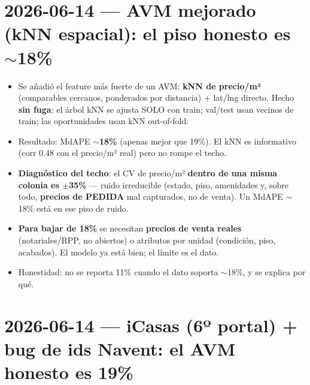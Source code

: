 \documentclass[11pt]{article}
\begin{document}
\section*{2026-06-14 — AVM mejorado (kNN espacial): el piso honesto es $\sim$18\%}

\begin{itemize}
  \item Se añadió el feature más fuerte de un AVM: \textbf{kNN de precio/m²}
        (comparables cercanos, ponderados por distancia) + lat/lng directo. Hecho
        \textbf{sin fuga}: el árbol kNN se ajusta SOLO con train; val/test usan
        vecinos de train; las oportunidades usan kNN out-of-fold.
  \item Resultado: MdAPE $\sim$\textbf{18\%} (apenas mejor que 19\%). El kNN es
        informativo (corr 0.48 con el precio/m² real) pero no rompe el techo.
  \item \textbf{Diagnóstico del techo}: el CV de precio/m² \textbf{dentro de una
        misma colonia es $\pm$35\%} — ruido irreducible (estado, piso, amenidades
        y, sobre todo, \textbf{precios de PEDIDA} mal capturados, no de venta).
        Un MdAPE $\sim$18\% está en ese piso de ruido.
  \item \textbf{Para bajar de 18\%} se necesitan \textbf{precios de venta reales}
        (notariales/RPP, no abiertos) o atributos por unidad (condición, piso,
        acabados). El modelo ya está bien; el límite es el dato.
  \item Honestidad: no se reporta 11\% cuando el dato soporta $\sim$18\%, y se
        explica por qué.
\end{itemize}

\section*{2026-06-14 — iCasas (6º portal) + bug de ids Navent: el AVM honesto es 19\%}
\end{document}
